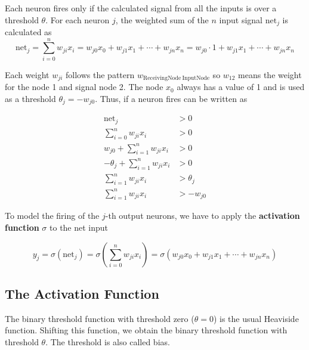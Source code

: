 \documentclass[11pt]{article}
\begin{document}
Each neuron fires only if the calculated signal from all the inputs is over a threshold $\theta$. For each neuron $j$, the weighted sum of the $n$ input signal $\text{net}_j$ is calculated as
\begin{equation}
    \text{net}_j = \sum_{i=0}^{n} w_{ji} x_i = w_{j0}x_0 + w_{j1}x_1 + \cdots + w_{jn}x_n = w_{j0} \cdot 1 + w_{j1}x_1 + \cdots + w_{jn}x_n
\end{equation}

Each weight $w_{ji}$ follows the pattern $w_{\text{ReceivingNode}\ \text{InputNode}}$ so $w_{12}$ means the weight for the node 1 and signal node 2. The node $x_0$ always has a value of 1 and is used as a threshold $\theta_j = -w_{j0}$. Thus, if a neuron fires can be written as

\begin{align*}
    \text{net}_j &> 0\\
    \sum_{i=0}^{n} w_{ji} x_i &> 0\\
    w_{j0} + \sum_{i=1}^{n} w_{ji} x_i &> 0\\
    -\theta_j + \sum_{i=1}^{n} w_{ji} x_i &> 0\\
    \sum_{i=1}^{n} w_{ji} x_i &> \theta_j\\
    \sum_{i=1}^{n} w_{ji} x_i &> -w_{j0}
\end{align*}

To model the firing of the $j$-th output neurons, we have to apply the \textbf{activation function} $\sigma$ to the net input

\begin{equation}
    y_j = \sigma(\text{net}_j) = \sigma(\sum_{i=0}^{n} w_{ji} x_i) = \sigma(w_{j0}x_0 + w_{j1}x_1 + \cdots + w_{jn}x_n)
\end{equation}

\subsection{The Activation Function}
The binary threshold function with threshold zero ($\theta = 0$) is the usual Heaviside function. Shifting this function, we obtain the binary threshold function with threshold $\theta$. The threshold is also called bias.
\end{document}
